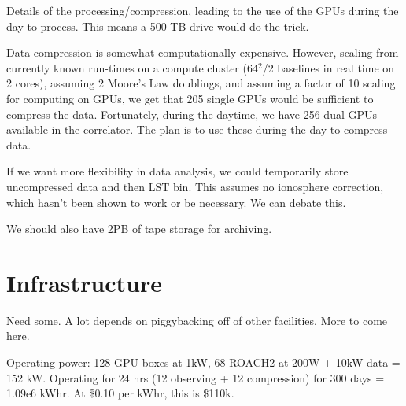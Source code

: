 \documentclass[11pt]{article}
\begin{document}
Details of the processing/compression, leading to the use of the GPUs during the day to process.
This means a 500 TB drive would do the trick.

Data compression is somewhat computationally expensive.  However, scaling from currently known run-times
on a compute cluster (64$^2$/2 baselines in real time on 2 cores), assuming 2 Moore's Law doublings,
and assuming a factor of 10 scaling for computing on GPUs, we get that 205 single GPUs would be sufficient
to compress the data.  Fortunately, during the daytime, we have 256 dual GPUs available in the correlator.
The plan is to use these during the day to compress data.

If we want more flexibility in data analysis, we could temporarily store uncompressed data and then
LST bin.  This assumes no ionosphere correction, which hasn't been shown to work or be necessary.
We can debate this.

We should also have 2PB of tape storage for archiving.

\section{Infrastructure}
\label{sec:infra}

Need some.  A lot depends on piggybacking off of other facilities.  More to come here.

Operating power: 128 GPU boxes at 1kW, 68 ROACH2 at 200W + 10kW data = 152 kW.  Operating for 24 hrs (12
observing + 12 compression) for 300 days = 1.09e6 kWhr.  At \$0.10 per kWhr, this is \$110k.
\end{document}
